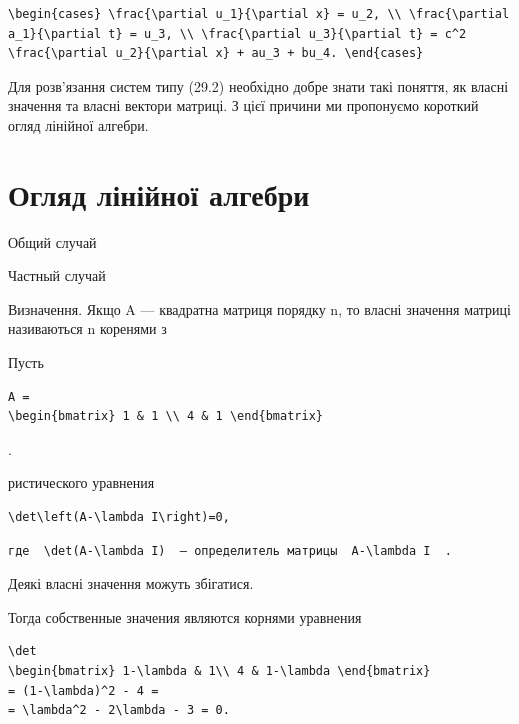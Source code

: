 \documentclass[
  ukrainian,
]{article}
\begin{document}
\begin{verbatim}
\begin{cases} \frac{\partial u_1}{\partial x} = u_2, \\ \frac{\partial a_1}{\partial t} = u_3, \\ \frac{\partial u_3}{\partial t} = c^2 \frac{\partial u_2}{\partial x} + au_3 + bu_4. \end{cases}
\end{verbatim}

Для розв'язання систем типу (29.2) необхідно добре знати такі поняття,
як власні значення та власні вектори матриці. З цієї причини ми
пропонуємо короткий огляд лінійної алгебри.

\section{Огляд лінійної
алгебри}\label{ux43eux433ux43bux44fux434-ux43bux456ux43dux456ux439ux43dux43eux457-ux430ux43bux433ux435ux431ux440ux438}

Общий случай

Частный случай

Визначення. Якщо A --- квадратна матриця порядку n, то власні значення
матриці називаються n коренями з

Пусть

\begin{verbatim}
A =
\begin{bmatrix} 1 & 1 \\ 4 & 1 \end{bmatrix}
\end{verbatim}

.

ристического уравнения

\begin{verbatim}
\det\left(A-\lambda I\right)=0,
\end{verbatim}

\begin{verbatim}
где  \det(A-\lambda I)  — определитель матрицы  A-\lambda I  .
\end{verbatim}

Деякі власні значення можуть збігатися.

Тогда собственные значения являются корнями уравнения

\begin{verbatim}
\det
\begin{bmatrix} 1-\lambda & 1\\ 4 & 1-\lambda \end{bmatrix}
= (1-\lambda)^2 - 4 =
= \lambda^2 - 2\lambda - 3 = 0.
\end{verbatim}
\end{document}
